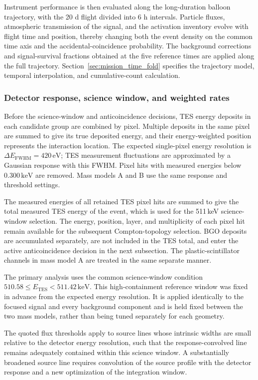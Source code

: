 \documentclass[11pt]{article}
\newcommand{\keV}{\ensuremath{\,\mathrm{keV}}}
\begin{document}
Instrument performance is then evaluated along the long-duration balloon
trajectory, with the 20 d flight divided into 6 h intervals. Particle fluxes,
atmospheric transmission of the signal, and the activation inventory evolve with flight
time and position, thereby changing both the event density on the common time
axis and the accidental-coincidence probability. The background corrections
and signal-survival fractions obtained at the five reference times are applied
along the full trajectory. Section~\ref{sec:mission_time_fold} specifies the
trajectory model, temporal interpolation, and cumulative-count calculation.

\subsubsection{Detector response, science window, and weighted rates}
\label{subsec:detector_response}

Before the science-window and anticoincidence decisions, TES energy deposits in
each candidate group are combined by pixel. Multiple deposits in the same pixel
are summed to give its true deposited energy, and their energy-weighted position
represents the interaction location. The expected single-pixel energy resolution
is $\Delta E_{\mathrm{FWHM}}=420\,\mathrm{eV}$; TES measurement fluctuations are
approximated by a Gaussian response with this FWHM. Pixel hits with measured
energies below $0.300\keV$ are removed. Mass models A and B use the same response
and threshold settings.

The measured energies of all retained TES pixel hits are summed to give the total
measured TES energy of the event, which is used for the 511\,keV science-window
selection. The energy, position, layer, and multiplicity of each pixel hit remain
available for the subsequent Compton-topology selection. BGO deposits are
accumulated separately, are not included in the TES total, and enter the active
anticoincidence decision in the next subsection. The plastic-scintillator channels
in mass model A are treated in the same separate manner.

The primary analysis uses the common science-window condition
$510.58\leq E_{\mathrm{TES}}<511.42\keV$. This
high-containment reference window was fixed in advance from the expected energy
resolution. It is applied identically to the focused signal and every background
component and is held fixed between the two mass models, rather than being tuned
separately for each geometry.

The quoted flux thresholds apply to source lines whose intrinsic widths are
small relative to the detector energy resolution, such that the
response-convolved line remains adequately contained within this science
window. A substantially broadened source line requires convolution of the
source profile with the detector response and a new optimization of the
integration window.
\end{document}
